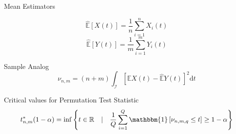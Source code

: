 \documentclass[12pt, a4paper]{article}
\theoremstyle{MAstyle} \newtheorem{assumption}{Assumption}[section]
\theoremstyle{MAstyle} \newtheorem{definition}{Definition}[section]
\begin{document}
			Mean Estimators
			\begin{multicols}{2}
				\noindent
				\begin{equation*}
					\hat{\mathbb{E}}\left[X(t)\right] = \frac{1}{n}\sum_{i = 1}^{n} X_i(t)
				\end{equation*}
				\begin{equation}
					\hat{\mathbb{E}}\left[Y(t)\right] = \frac{1}{m}\sum_{i = 1}^{m} Y_i(t)
				\end{equation}
			\end{multicols}
		
			Sample Analog
			\begin{equation}
				\nu_{n,m} = (n+m) \int_{\mathcal{I}} \left[\hat{\mathbb{E}}X(t) - \hat{\mathbb{E}}Y(t)\right]^2 \mathrm{d}t
			\end{equation}
		
			Critical values for Permutation Test Statistic
			\begin{equation}
				t^{*}_{n,m}(1-\alpha) = \inf \left\{t \in \mathbb{R} \quad \vert \quad \frac{1}{Q} \sum_{i = 1}^{Q} \mathbbm{1}\left[\nu_{n,m,q} \leq t\right] \geq 1 - \alpha \right\}
			\end{equation}
		
\end{document}
